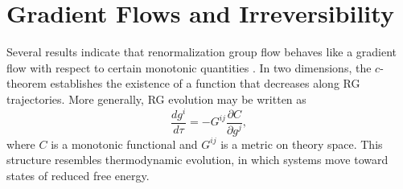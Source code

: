\documentclass[12pt,a4paper]{article}
\theoremstyle{plain}
\theoremstyle{definition}
\theoremstyle{remark}
\begin{document}
\section{Gradient Flows and Irreversibility}

Several results indicate that renormalization group flow behaves like a
gradient flow with respect to certain monotonic quantities
\cite{Zamolodchikov1986,Cardy1996}. In two dimensions, the $c$-theorem
establishes the existence of a function that decreases along RG
trajectories. More generally, RG evolution may be written as
\begin{equation}
\frac{d g^i}{d\tau} = -G^{ij} \frac{\partial C}{\partial g^j},
\end{equation}
where $C$ is a monotonic functional and $G^{ij}$ is a metric on theory
space. This structure resembles thermodynamic evolution, in which
systems move toward states of reduced free energy.
\end{document}
